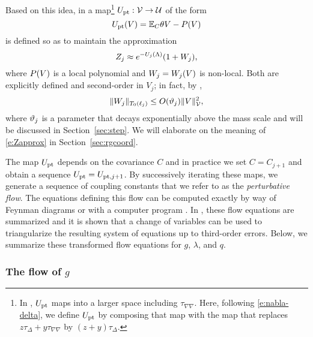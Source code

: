 Based on this idea, in \cite{BBS-rg-pt}
a map\footnote{In \cite{BBS-rg-pt}, $U_{\rm pt}$ maps into a
larger space including $\tau_{\nabla\nabla}$. Here, following \eqref{e:nabla-delta},
we define $U_{\rm pt}$ by composing that map with the map that replaces
$z \tau_\Delta + y \tau_{\nabla\nabla}$ by $(z + y) \tau_\Delta$.}
$U_{\rm pt} : \mathcal{V}\rightarrow\mathcal{U}$ of the form
\begin{equation}
\label{e:Vpt-def}
U_{\rm pt}(V) = \mathbb{E}_C\theta V - P(V)
\end{equation}
is defined so as to maintain the approximation
\begin{equation}
\label{e:Zapprox}
Z_j \approx e^{-U_j(\Lambda)} (1 + W_j),
\end{equation}
where $P(V)$ is a local polynomial and $W_j = W_j(V)$ is non-local.
Both are explicitly defined and second-order in $V_j$;
in fact, by \cite[\eqref{IE-e:W-logwish}]{BS-rg-IE},
\begin{equation}
\label{e:Wbilinbd}
\|W_j\|_{T_0(\ell_j)}
	\le
O(\vartheta_j) \|V\|_{\mathcal{V}}^2,
\end{equation}
where $\vartheta_j$ is a parameter that decays exponentially above the mass scale
and will be discussed in Section~\ref{sec:step}. We will elaborate on the  meaning
of \eqref{e:Zapprox} in Section~\ref{sec:rgcoord}.


The map $U_{\rm pt}$ depends on the covariance $C$ and
in practice we set $C = C_{j+1}$ and obtain a sequence $U_{\rm pt} = U_{\mathrm{pt},j+1}$.
By successively iterating these maps, we generate a sequence of coupling constants that
we refer to as the \emph{perturbative flow}. The equations defining this flow can be
computed exactly by way of Feynman diagrams or with a computer program \cite{BBS-rg-ptsoft}.
In \cite{BBS-rg-pt}, these flow equations are summarized and it is shown that a change of
variables can be used to triangularize the resulting system of equations up to third-order
errors. Below, we summarize these transformed flow equations for $g$, $\lambda$, and $q$.

\subsubsection{The flow of \texorpdfstring{$g$}{g}}


